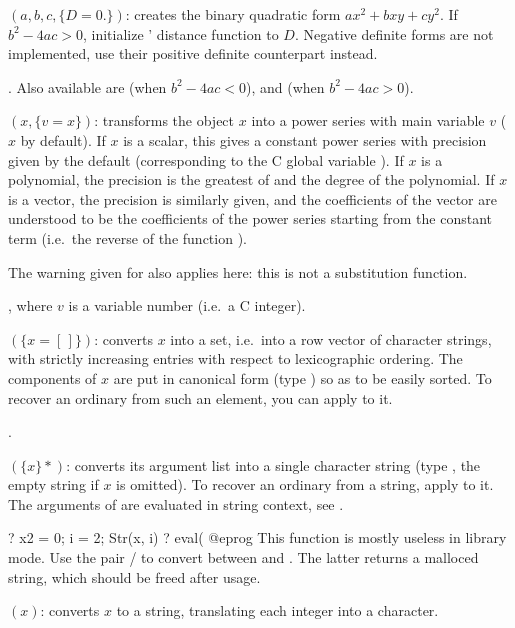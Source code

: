 $(a,b,c,\{D=0.\})$: creates the binary quadratic form
$ax^2+bxy+cy^2$. If $b^2-4ac>0$, initialize ' distance
function to $D$. Negative definite forms are not implemented,
use their positive definite counterpart instead.

. Also available are
 (when $b^2-4ac<0$), and
 (when $b^2-4ac>0$).

$(x,\{v=x\})$: transforms the object $x$ into a power series
with main variable $v$ ($x$ by default). If $x$ is a scalar, this gives a
constant power series with precision given by the default 
(corresponding to the C global variable ). If $x$ is a
polynomial, the precision is the greatest of  and the degree of
the polynomial. If $x$ is a vector, the precision is similarly given, and the
coefficients of the vector are understood to be the coefficients of the power
series starting from the constant term (i.e.~the reverse of the function
).

The warning given for  also applies here: this is not a substitution
function.

, where $v$ is a variable number (i.e.~a C integer).

$(\{x=[\,]\})$: converts $x$ into a set, i.e.~into a row
vector of character strings, with strictly increasing entries with respect to
lexicographic ordering. The components of $x$ are put in canonical form (type
) so as to be easily sorted. To recover an ordinary  from
such an element, you can apply  to it.

.

$(\{x\}*)$: converts its argument list into a
single character string (type , the empty string if $x$ is omitted).
To recover an ordinary  from a string, apply  to it. The
arguments of  are evaluated in string context, see .

\bprog
? x2 = 0; i = 2; Str(x, i)
? eval(%
@eprog\noindent
This function is mostly useless in library mode. Use the pair
/ to convert between  and .
The latter returns a malloced string, which should be freed after usage.

$(x)$: converts $x$ to a string, translating each integer
into a character.

